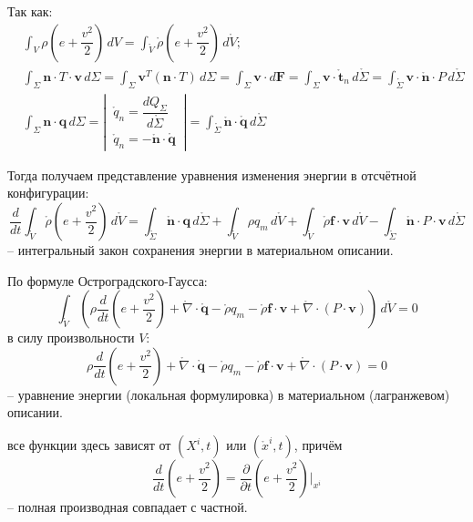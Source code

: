 Так как:
\begin{align*}
  &\int_V \rho \left( e + \dfrac{v^2}{2} \right) \, dV
  = \int_{\mathring{V}} \mathring{\rho} \left( e + \dfrac{v^2}{2} \right) \, d\mathring{V}; \\
  &\int_\Sigma \mathbf{n} \cdot T \cdot \mathbf{v} \, d\Sigma
  = \int_\Sigma \mathbf{v}^T \left( \mathbf{n} \cdot T \right) \, d\Sigma
  = \int_\Sigma \mathbf{v} \cdot d\mathcal{\mathbf{F}}
  = \int_\Sigma \mathbf{v} \cdot \mathring{\mathbf{t}}_n \, d\mathring{\Sigma}
  = \int_{\mathring{\Sigma}} \mathbf{v} \cdot \mathring{\mathbf{n}} \cdot P \, d\mathring{\Sigma} \\
  &\int_\Sigma \mathbf{n} \cdot \mathbf{q} \, d\Sigma
  = \left|\, \begin{aligned} \mathring{q}_n = \dfrac{dQ_\Sigma}{d\mathring{\Sigma}} \\ \mathring{q}_n = - \mathring{\mathbf{n}} \cdot \mathring{\mathbf{q}} \end{aligned} \,\right| 
  = \int_{\mathring{\Sigma}} \mathring{\mathbf{n}} \cdot \mathring{\mathbf{q}} \, d\mathring{\Sigma}
\end{align*}

Тогда получаем представление уравнения изменения энергии в отсчётной конфигурации:
\[
  \dfrac{d}{dt} \int_{\mathring{V}} \mathring{\rho} \left( e+\dfrac{v^2}{2} \right) \, d\mathring{V}
  = \int_{\mathring{\Sigma}} \mathring{\mathbf{n}} \cdot \mathbf{q} \, d\mathring{\Sigma}
  + \int_{\mathring{V}} \rho q_m \, d\mathring{V}
  + \int_\mathring{V} \mathring{\rho} \mathbf{f} \cdot \mathbf{v} \, d\mathring{V}
  - \int_{\mathring{\Sigma}} \mathring{\mathbf{n}} \cdot P \cdot \mathbf{v} \, d\mathring{\Sigma}
\]
-- интегральный закон сохранения энергии в материальном описании.

По формуле Остроградского-Гаусса:
\[
  \int_{\mathring{V}} \left(  \rho \dfrac{d}{dt} \left( e+\dfrac{v^2}{2} \right) + \mathring{\nabla} \cdot \mathring{\mathbf{q}} - \mathring{\rho} q_m - \mathring{\rho} \mathbf{f} \cdot \mathbf{v} + \mathring{\nabla} \cdot \left( P\cdot\mathbf{v} \right)  \right) \, d\mathring{V} = 0
\]
в силу произвольности $V$:
\[
  \rho \dfrac{d}{dt} \left( e+\dfrac{v^2}{2} \right) + \mathring{\nabla} \cdot \mathring{\mathbf{q}} - \mathring{\rho} q_m - \mathring{\rho} \mathbf{f} \cdot \mathbf{v} + \mathring{\nabla} \cdot \left( P\cdot\mathbf{v} \right) = 0
\]
-- уравнение энергии (локальная формулировка) в материальном (лагранжевом) описании.

все функции здесь зависят от $(X^i, t)$ или $(\mathring{x}^i, t)$, причём
\[
  \dfrac{d}{dt} \left( e+\dfrac{v^2}{2} \right) = \dfrac{\partial }{\partial t} \left( e+\dfrac{v^2}{2} \right) |_{x^i}
\]
-- полная производная совпадает с частной.



